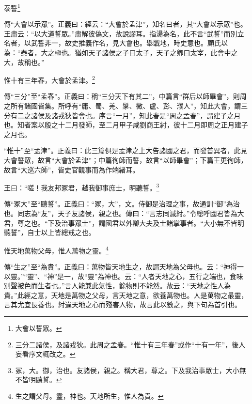 泰誓\footnote{大會以誓眾。}

{\noindent\shu{}\fzkt 傳“大會以示眾”。正義曰：經云：“大會於孟津”，知名曰者，其“大會以示眾”也。王肅云：“以大道誓眾。”肅解彼偽文，故說謬耳。指湯為名，此不言“武誓”而別立名者，以武誓非一，故史推義作名，見大會也。舉戰地，時史意也。顧氏以為：“泰者，大之極也。猶如天子諸侯之子曰太子，天子之卿曰太宰，此會中之大，故稱也。” \par}

惟十有三年春，大會於孟津。\footnote{三分二諸侯，及諸戎狄。此周之孟春。“惟十有三年春”或作“十有一年”，後人妄看序文輒改之。}

{\noindent\zhuan{}\fzbyks 傳“三分”至“孟春”。正義曰：稱“三分天下有其二”，中篇言“群后以師畢會”，則周之所有諸國皆集。所呼有“庸、蜀、羌、髳、微、盧、彭、濮人”，知此大會，謂三分有二之諸侯及諸戎狄皆會也。序言“一月”，知此春是“周之孟春”，謂建子之月也。知者案以殷之十二月發師，至二月甲子咸劉商王紂，彼十二月即周之正月建子之月也。 \par}

{\noindent\shu{}\fzkt “惟十”至“孟津”。正義曰：此三篇俱是孟津之上大告諸國之君，而發首異者，此見大會誓眾，故言“大會於孟津”；中篇徇師而誓，故言“以師畢會”；下篇王更徇師，故言“大巡六師”，皆史官觀事而為作端緒耳。 \par}

王曰：“嗟！我友邦冢君，越我御事庶士，明聽誓。\footnote{冢，大。御，治也。友諸侯，親之。稱大君，尊之。下及我治事眾士，大小無不皆明聽誓。}

{\noindent\zhuan{}\fzbyks 傳“冢大”至“聽誓”。正義曰：“冢，大”，文。侍御是治理之事，故通訓“御”為治也。同志為“友”，天子友諸侯，親之也。傳曰：“言志同滅紂。”令總呼國君皆為大君，尊之也。“下及治事眾士”，謂國君以外卿大夫及士諸掌事者。“大小無不皆明聽誓”，自士以上皆總戒之也。 \par}

惟天地萬物父母，惟人萬物之靈。\footnote{生之謂父母。靈，神也。天地所生，惟人為貴。}

{\noindent\zhuan{}\fzbyks 傳“生之”至“為貴”。正義曰：萬物皆天地生之，故謂天地為父母也。云：“神得一以靈。”“靈”、“神”是一，故“靈”為神也。云：“人者天地之心，五行之端也，食味別聲被色而生者也。”言人能兼此氣性，餘物則不能然。故云：“天地之性人為貴。”此經之意，天地是萬物之父母，言天地之意，欲養萬物也。人是萬物之最靈，言其尤宜長養也。紂違天地之心而殘害人物，故言此以數之，與下句為首引也。 \par}

